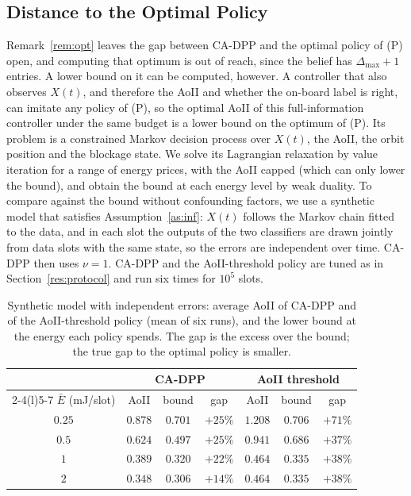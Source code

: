 \documentclass[5p,twocolumn]{elsarticle}
\theoremstyle{remark}
\begin{document}
\subsection{Distance to the Optimal Policy}\label{res:opt}
Remark~\ref{rem:opt} leaves the gap between CA-DPP and the optimal policy of (P) open, and computing that optimum is out of reach, since the belief has $\Delta_{\max}+1$ entries. A lower bound on it can be computed, however. A controller that also observes $X(t)$, and therefore the AoII and whether the on-board label is right, can imitate any policy of (P), so the optimal AoII of this full-information controller under the same budget is a lower bound on the optimum of (P). Its problem is a constrained Markov decision process over $X(t)$, the AoII, the orbit position and the blockage state. We solve its Lagrangian relaxation by value iteration for a range of energy prices, with the AoII capped (which can only lower the bound), and obtain the bound at each energy level by weak duality. To compare against the bound without confounding factors, we use a synthetic model that satisfies Assumption~\ref{as:inf}: $X(t)$ follows the Markov chain fitted to the data, and in each slot the outputs of the two classifiers are drawn jointly from data slots with the same state, so the errors are independent over time. CA-DPP then uses $\nu=1$. CA-DPP and the AoII-threshold policy are tuned as in Section~\ref{res:protocol} and run six times for $10^5$ slots.

\begin{table}[t]
\caption{Synthetic model with independent errors: average AoII of CA-DPP and of the AoII-threshold policy (mean of six runs), and the lower bound at the energy each policy spends. The gap is the excess over the bound; the true gap to the optimal policy is smaller.}\label{tab:optgap}
\centering\footnotesize
\begin{tabular}{@{}ccccccc@{}}
\toprule
 & \multicolumn{3}{c}{CA-DPP} & \multicolumn{3}{c}{AoII threshold}\\
\cmidrule(lr){2-4}\cmidrule(l){5-7}
$\bar E$ (mJ/slot) & AoII & bound & gap & AoII & bound & gap\\
\midrule
$0.25$ & $0.878$ & $0.701$ & $+25\%$ & $1.208$ & $0.706$ & $+71\%$\\
$0.5$ & $0.624$ & $0.497$ & $+25\%$ & $0.941$ & $0.686$ & $+37\%$\\
$1$ & $0.389$ & $0.320$ & $+22\%$ & $0.464$ & $0.335$ & $+38\%$\\
$2$ & $0.348$ & $0.306$ & $+14\%$ & $0.464$ & $0.335$ & $+38\%$\\
\bottomrule
\end{tabular}
\end{table}
\end{document}
